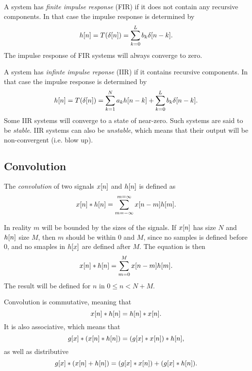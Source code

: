 \documentclass[11pt]{article}
\let\originalleft\left
\let\originalright\right
\renewcommand{\left}{\mathopen{}\mathclose\bgroup\originalleft}
\renewcommand{\right}{\aftergroup\egroup\originalright}
\def\lsqb{\left[}
\def\rsqb{\right]}
\def\sqb#1{\lsqb #1 \rsqb}
\def\xsig{x\sqb{n}}
\begin{document}
A system has \textit{finite impulse response} (FIR) if it does not contain any recursive components. In that case the impulse response is determined by
\begin{equation}
    h\sqb{n} = T(\delta\sqb{n}) = \sum_{k = 0}^L b_k \delta\sqb{n - k}.
\end{equation}
The impulse response of FIR systems will always converge to zero.

A system has \textit{infinte impulse reponse} (IIR) if it contains recursive components. In that case the impulse response is determined by
\begin{equation}
    h\sqb{n} = T(\delta\sqb{n}) = \sum_{k=1}^N a_k h\sqb{n - k} + \sum_{k = 0}^L b_k \delta\sqb{n - k}.
\end{equation}
Some IIR systems will converge to a state of near-zero. Such systems are said to be \textit{stable}. IIR systems can also be \textit{unstable}, which means that their output will be non-convergent (i.e. blow up).

\subsection{Convolution}
The \textit{convolution} of two signals $\xsig$ and $h\sqb{n}$ is defined as
\begin{equation}
    \xsig * h\sqb{n} = \sum_{m = -\infty}^{m = \infty} x\sqb{n - m}h\sqb{m}.
\end{equation}

In reality $m$ will be bounded by the sizes of the signals. If $\xsig$ has size $N$ and $h\sqb{n}$ size $M$, then $m$ should be within $0$ and $M$, since no samples is defined before $0$, and no smaples in $h\sqb{x}$ are defined after $M$. The equation is then
\begin{equation}
    \xsig * h\sqb{n} = \sum_{m = 0}^{M} x\sqb{n - m}h\sqb{m}.
\end{equation}
The result will be defined for $n$ in $0 \leq n < N + M$.

Convolution is commutative, meaning that
\begin{equation}
    \xsig * h\sqb{n} = h\sqb{n} * \xsig.
\end{equation}
It is also associative, which means that
\begin{equation}
    g\sqb{x} * (\xsig * h\sqb{n}) = (g\sqb{x} * \xsig) * h\sqb{n},
\end{equation}
as well as distributive
\begin{equation}
    g\sqb{x} * (\xsig + h\sqb{n}) = (g\sqb{x} * \xsig) + (g\sqb{x} *  h\sqb{n}).
\end{equation}
\end{document}
